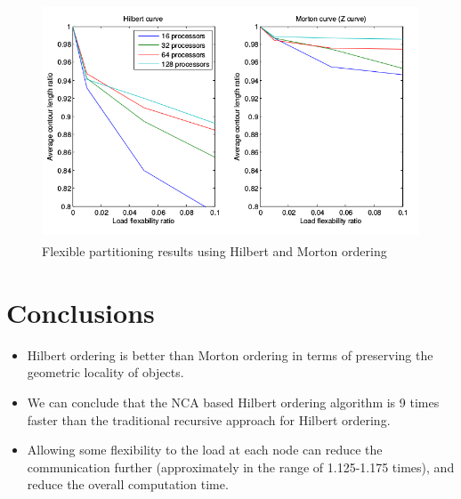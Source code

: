\documentclass[a0,landscape]{a0poster}
\begin{document}
\begin{multicols}{4}
\begin{figure}[H]
\centering
\includegraphics[height=7cm,keepaspectratio]{flexibility.png}
\caption{ Flexible partitioning results using Hilbert and Morton ordering \label{flexibility}}
\end{figure}





\color{SaddleBrown} %

\section*{Conclusions}

\begin{itemize}
\item Hilbert ordering is better than Morton ordering in terms of preserving the geometric locality of objects. 
\item We can conclude that the NCA based Hilbert ordering algorithm is 9 times faster than the traditional recursive approach for Hilbert ordering. 
\item Allowing some flexibility to the load at each node can reduce the communication further  (approximately in the range of 1.125-1.175 times), and reduce the overall computation time. 
\end{itemize}

\color{DarkSlateGray} %


\end{multicols}
\end{document}
